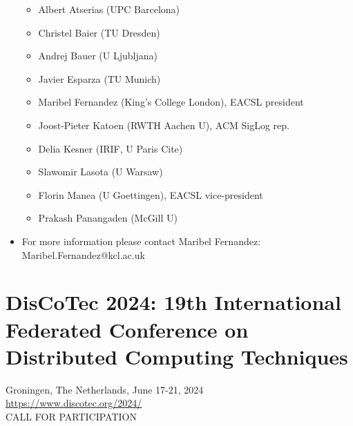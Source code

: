 \documentclass[prodmode,acmtecs]{acmsmall} %
\begin{document}
\begin{itemize}
\begin{itemize}\item  Albert Atserias (UPC Barcelona)
\item  Christel Baier (TU Dresden)
\item  Andrej Bauer (U Ljubljana)
\item  Javier Esparza (TU Munich)
\item  Maribel Fernandez (King’s College London), EACSL president
\item  Joost-Pieter Katoen (RWTH Aachen U), ACM SigLog rep.
\item  Delia Kesner (IRIF, U Paris Cite)
\item  Slawomir Lasota (U Warsaw)
\item  Florin Manea (U Goettingen), EACSL vice-president
\item  Prakash Panangaden (McGill U)
\end{itemize} 
\item  For more information please contact Maribel Fernandez: Maribel.Fernandez@kcl.ac.uk 
 
\end{itemize}\section{DisCoTec 2024: 19th International Federated Conference on Distributed Computing Techniques}\label{DisCoTec2024}  Groningen, The Netherlands, June 17-21, 2024\\ 
  \href{https://www.discotec.org/2024/}{https://www.discotec.org/2024/}\\ 
CALL FOR PARTICIPATION 
\end{document}

